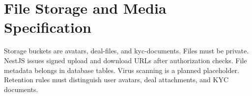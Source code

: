 \chapter{File Storage and Media Specification}
Storage buckets are avatars, deal-files, and kyc-documents. Files must be private. NestJS issues signed upload and download URLs after authorization checks. File metadata belongs in database tables. Virus scanning is a planned placeholder. Retention rules must distinguish user avatars, deal attachments, and KYC documents.
